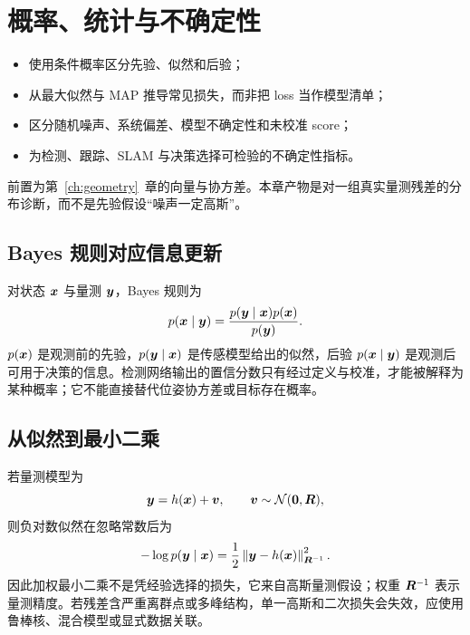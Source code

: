 \chapter{概率、统计与不确定性}
\label{ch:probability}

\begin{learningobjectives}
\begin{itemize}
  \item 使用条件概率区分先验、似然和后验；
  \item 从最大似然与 MAP 推导常见损失，而非把 loss 当作模型清单；
  \item 区分随机噪声、系统偏差、模型不确定性和未校准 score；
  \item 为检测、跟踪、SLAM 与决策选择可检验的不确定性指标。
\end{itemize}
\end{learningobjectives}

\begin{prerequisites}
前置为第~\ref{ch:geometry}~章的向量与协方差。本章产物是对一组真实量测残差的分布诊断，而不是先验假设“噪声一定高斯”。
\end{prerequisites}

\section{Bayes 规则对应信息更新}

对状态 $\bm{x}$ 与量测 $\bm{y}$，Bayes 规则为
\begin{equation}
  p(\bm{x}\mid\bm{y})=
  \frac{p(\bm{y}\mid\bm{x})p(\bm{x})}{p(\bm{y})}.
\end{equation}
$p(\bm{x})$ 是观测前的先验，$p(\bm{y}\mid\bm{x})$ 是传感模型给出的似然，后验 $p(\bm{x}\mid\bm{y})$ 是观测后可用于决策的信息。检测网络输出的置信分数只有经过定义与校准，才能被解释为某种概率；它不能直接替代位姿协方差或目标存在概率。

\section{从似然到最小二乘}

若量测模型为
\begin{equation}
  \bm{y}=h(\bm{x})+\bm{v},
  \qquad \bm{v}\sim\mathcal{N}(\bm{0},\bm{R}),
\end{equation}
则负对数似然在忽略常数后为
\begin{equation}
  -\log p(\bm{y}\mid\bm{x})
  =\frac{1}{2}\left\|\bm{y}-h(\bm{x})\right\|_{\bm{R}^{-1}}^2.
\end{equation}
因此加权最小二乘不是凭经验选择的损失，它来自高斯量测假设；权重 $\bm{R}^{-1}$ 表示量测精度。若残差含严重离群点或多峰结构，单一高斯和二次损失会失效，应使用鲁棒核、混合模型或显式数据关联。

